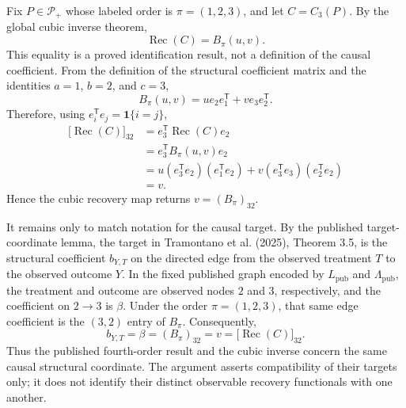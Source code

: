 Fix \(P\in\mathcal P_+\) whose labeled order is \(\pi=(1,2,3)\), and let \(C=C_3(P)\).  By the global cubic inverse theorem,
\[
\operatorname{Rec}(C)=B_\pi(u,v).
\]
This equality is a proved identification result, not a definition of the causal coefficient.  From the definition of the structural coefficient matrix and the identities \(a=1\), \(b=2\), and \(c=3\),
\[
B_\pi(u,v)=u e_2e_1^{\mathsf T}+v e_3e_2^{\mathsf T}.
\]
Therefore, using \(e_i^{\mathsf T}e_j=\mathbf 1\{i=j\}\),
\[
\begin{aligned}
\bigl[\operatorname{Rec}(C)\bigr]_{32}
&=e_3^{\mathsf T}\operatorname{Rec}(C)e_2\\
&=e_3^{\mathsf T}B_\pi(u,v)e_2\\
&=u(e_3^{\mathsf T}e_2)(e_1^{\mathsf T}e_2)
  +v(e_3^{\mathsf T}e_3)(e_2^{\mathsf T}e_2)\\
&=v.
\end{aligned}
\]
Hence the cubic recovery map returns \(v=(B_\pi)_{32}\).

It remains only to match notation for the causal target.  By the published target-coordinate lemma, the target in Tramontano et al. (2025), Theorem 3.5, is the structural coefficient \(b_{Y,T}\) on the directed edge from the observed treatment \(T\) to the observed outcome \(Y\).  In the fixed published graph encoded by \(L_{\mathrm{pub}}\) and \(\Lambda_{\mathrm{pub}}\), the treatment and outcome are observed nodes \(2\) and \(3\), respectively, and the coefficient on \(2\to3\) is \(\beta\).  Under the order \(\pi=(1,2,3)\), that same edge coefficient is the \((3,2)\) entry of \(B_\pi\).  Consequently,
\[
b_{Y,T}=\beta=(B_\pi)_{32}=v
=\bigl[\operatorname{Rec}(C)\bigr]_{32}.
\]
Thus the published fourth-order result and the cubic inverse concern the same causal structural coordinate.  The argument asserts compatibility of their targets only; it does not identify their distinct observable recovery functionals with one another.
